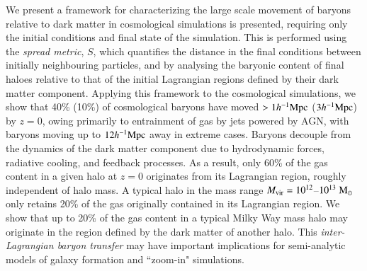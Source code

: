 We present a framework for characterizing the large scale movement of baryons
relative to dark matter in cosmological simulations is presented, requiring
only the initial conditions and final state of the simulation. This is
performed using the {\it spread metric}, $S$, which quantifies the distance
in the final conditions between initially neighbouring particles, and by
analysing the baryonic content of final haloes relative to that of the
initial Lagrangian regions defined by their dark matter component. Applying
this framework to the \simba{} cosmological simulations, we show that 40\%
(10\%) of cosmological baryons have moved $> 1h^{-1}{\rm Mpc}{}$ ($3h^{-1}{\rm Mpc}{}$) by $z=0$,
owing primarily to entrainment of gas by jets powered by AGN, with baryons
moving up to $12h^{-1}{\rm Mpc}{}$ away in extreme cases. Baryons decouple from the
dynamics of the dark matter component due to hydrodynamic forces, radiative
cooling, and feedback processes. As a result, only 60\% of the gas content in
a given halo at $z=0$ originates from its Lagrangian region, roughly
independent of halo mass. A typical halo in the mass range $M_{\rm vir} =
10^{12}$--$10^{13}\;{\rm M}_{\odot}$ only retains 20\% of the gas originally contained
in its Lagrangian region. We show that up to 20\% of the gas content in a
typical Milky Way mass halo may originate in the region defined by the dark
matter of another halo. This {\it inter-Lagrangian baryon transfer} may have
important implications for semi-analytic models of galaxy formation and
``zoom-in" simulations.